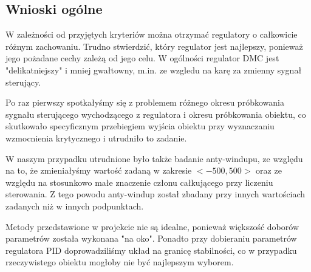 \documentclass[a4paper, 10pt]{article}
\begin{document}
\subsection{Wnioski ogólne}
W zależności od przyjętych kryteriów można otrzymać regulatory o całkowicie różnym zachowaniu. Trudno stwierdzić, który regulator jest najlepszy, ponieważ jego pożadane cechy zależą od jego celu. W ogólności regulator DMC jest "delikatniejszy" i mniej gwałtowny, m.in. ze wzgledu na karę za zmienny sygnał sterujący. 

Po raz pierwszy spotkałyśmy się z problemem różnego okresu próbkowania sygnału sterującego wychodzącego z regulatora i okresu próbkowania obiektu, co skutkowało specyficznym przebiegiem wyjścia obiektu przy wyznaczaniu wzmocnienia krytycznego i utrudniło to zadanie. 

W naszym przypadku utrudnione było także badanie anty-windupu, ze względu na to, że zmieniałyśmy wartość zadaną w zakresie $<-500,500>$ oraz ze względu na stosunkowo małe znaczenie członu całkującego przy liczeniu sterowania. Z tego powodu anty-windup został zbadany przy innych wartościach zadanych niż  w innych podpunktach. 

Metody przedstawione w projekcie nie są idealne, ponieważ większość doborów parametrów została wykonana \."na oko". Ponadto przy dobieraniu parametrów regulatora PID doprowadziliśmy układ na granicę stabilności, co w przypadku rzeczywistego obiektu mogłoby nie być najlepszym wyborem.
\end{document}
